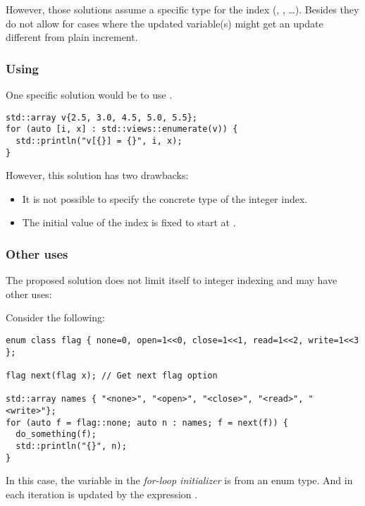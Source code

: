However, those solutions assume a specific type for the index (,
, \ldots). Besides they do not allow for cases where the
updated variable(s) might get an update different from plain increment.

\subsubsection{Using }

One specific solution would be to use .

\begin{lstlisting}
std::array v{2.5, 3.0, 4.5, 5.0, 5.5};
for (auto [i, x] : std::views::enumerate(v)) {
  std::println("v[{}] = {}", i, x);
}
\end{lstlisting}

However, this solution has two drawbacks:
\begin{itemize}

\item 
It is not possible to specify the concrete type of the integer index.

\item 
The initial value of the index is fixed to start at .

\end{itemize}

\subsubsection{Other uses}

The proposed solution does not limit itself to integer indexing and may have
other uses:

Consider the following:

\begin{lstlisting}
enum class flag { none=0, open=1<<0, close=1<<1, read=1<<2, write=1<<3 };

flag next(flag x); // Get next flag option

std::array names { "<none>", "<open>", "<close>", "<read>", "<write>"};
for (auto f = flag::none; auto n : names; f = next(f)) {
  do_something(f); 
  std::println("{}", n);
}
\end{lstlisting}

In this case, the variable  in the \emph{for-loop initializer} is from
an enum type. And in each iteration is updated by the expression .

